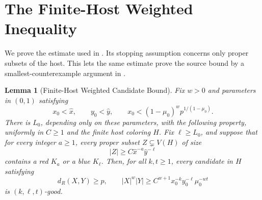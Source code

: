 \documentclass[11pt]{article}
\newtheorem{lemma}{Lemma}[section]
\theoremstyle{definition}
\begin{document}
\clearpage
\appendix

\section{The Finite-Host Weighted Inequality}\label{sec:weighted-proof}
We prove the estimate used in .
Its stopping assumption concerns only proper subsets of the host.
This lets the same estimate prove the source bound by a smallest-counterexample argument in .

\begingroup
{}
\begin{lemma}[Finite-Host Weighted Candidate Bound]\label{lem:local}
Fix \(w>0\) and parameters in \((0,1)\) satisfying
\[
 x_0<\widehat x,\qquad y_0<\widehat y,\qquad
 x_0<(1-\mu_0)^w p^{1/(1-\mu_0)}.
\]
There is \(L_0\), depending only on these parameters, with the following property, uniformly in \(C\ge1\) and the finite host coloring \(H\). Fix \(\ell\ge L_0\), and suppose that for every integer \(a\ge1\), every proper subset \(Z\subsetneq V(H)\) of size
\begin{equation}\label{eq:local-stop}
 |Z|\ge C\widehat x^{-a}\widehat y^{-\ell}
\end{equation}
contains a red \(K_a\) or a blue \(K_\ell\). Then, for all \(k,t\ge1\), every candidate in \(H\) satisfying
\begin{equation}\label{eq:local-size}
 d_R(X,Y)\ge p,\qquad
 |X|^w|Y|\ge C^{w+1}x_0^{-k}y_0^{-\ell}\mu_0^{-wt}
\end{equation}
is \((k,\ell,t)\)-good.
\end{lemma}
\endgroup
\end{document}
